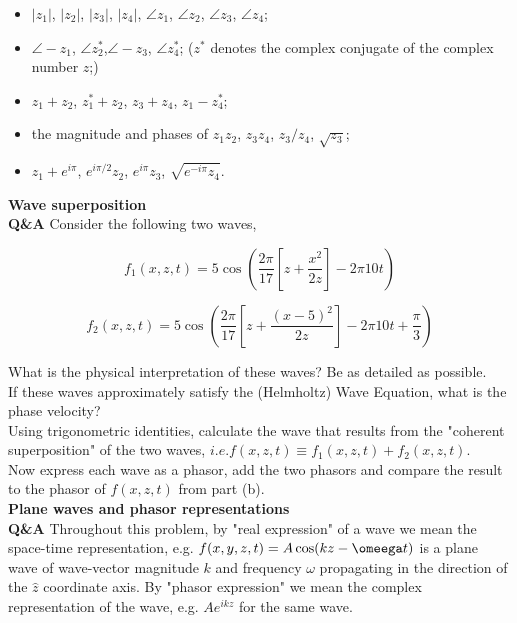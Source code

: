 \documentclass[main.tex]{subfiles}
\begin{document}
\begin{itemize}
  \item $|z_1|$, $|z_2|$, $|z_3|$, $|z_4|$, $\angle z_1$, $\angle z_2$, $\angle z_3$, $\angle z_4$;
  \item $\angle -z_1$, $\angle z_2^*$,$\angle -z_3$, $\angle z_4^*$; ($z^*$ denotes the complex conjugate of the complex number $z$;)
  \item $z_1 + z_2$, $z_1^* + z_2$, $z_3 + z_4$, $z_1 - z_4^*$;
  \item the magnitude and phases of  $z_1 z_2$, $z_3 z_4$, $z_3 / z_4$, $\sqrt{z_3}$;
  \item $z_1 + e^{i \pi}$, $e^{i \pi / 2}z_2$, $e^{i\pi}z_3$, $\sqrt{e^{-i\pi}z_4}$.
\end{itemize}

\textbf{Wave superposition}\\
\textbf{Q\&A} Consider the following two waves,

\begin{equation}\label{eq:ws_1}
f_1(x,z,t) = 5\cos \left(\frac{2 \pi}{17} \left[ z+\frac{x^2}{2z} \right] -2\pi 10t \right)
\end{equation}

\begin{equation}\label{eq:ws_2}
f_2(x,z,t) = 5\cos \left(\frac{2 \pi}{17} \left[ z+\frac{(x-5)^2}{2z} \right] -2\pi 10t + \frac{\pi}{3} \right)
\end{equation}

What is the physical interpretation of these waves? Be as detailed as possible.\\

If these waves approximately satisfy the (Helmholtz) Wave Equation, what is the phase velocity?\\

Using trigonometric identities, calculate the wave that results from the "coherent superposition" of the two waves, $i.e. f(x,z,t) \equiv f_1(x,z,t) + f_2(x,z,t)$.\\

Now express each wave as a phasor, add the two phasors and compare the result to the phasor of $f(x,z,t)$ from part (b).\\

\textbf{Plane waves and phasor representations}\\
\textbf{Q\&A} Throughout this problem, by "real expression" of a wave we mean the space-time representation, e.g. $f(x,y,z,t) = A\cos(kz-\omeega t)$ is a plane wave of wave-vector magnitude $k$ and frequency $\omega$ propagating in the direction of the $\hat{z}$ coordinate axis. By "phasor expression" we mean the complex representation of the wave, e.g. $Ae^{ikz}$ for the same wave.\\
\end{document}
